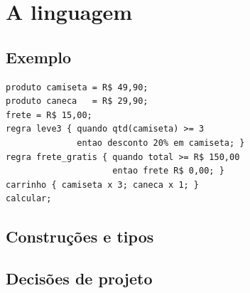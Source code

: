 \section{A linguagem}

\subsection{Exemplo}
\begin{lstlisting}
produto camiseta = R$ 49,90;
produto caneca   = R$ 29,90;
frete = R$ 15,00;
regra leve3 { quando qtd(camiseta) >= 3
              entao desconto 20% em camiseta; }
regra frete_gratis { quando total >= R$ 150,00
                     entao frete R$ 0,00; }
carrinho { camiseta x 3; caneca x 1; }
calcular;
\end{lstlisting}

\subsection{Construções e tipos}

\subsection{Decisões de projeto}
